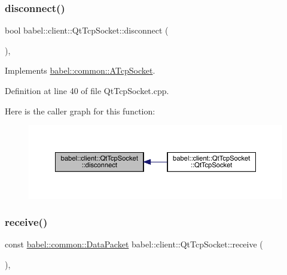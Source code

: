 \subsubsection{\texorpdfstring{disconnect()}{disconnect()}}
{\footnotesize\ttfamily bool babel\+::client\+::\+Qt\+Tcp\+Socket\+::disconnect (\begin{DoxyParamCaption}{ }\end{DoxyParamCaption})\hspace{0.3cm}{\ttfamily [override]}, {\ttfamily [virtual]}}



Implements \mbox{\hyperlink{classbabel_1_1common_1_1_a_tcp_socket_a8aa4d31dccc7314d5866410846d83159}{babel\+::common\+::\+A\+Tcp\+Socket}}.



Definition at line 40 of file Qt\+Tcp\+Socket.\+cpp.

Here is the caller graph for this function\+:\nopagebreak
\begin{figure}[H]
\begin{center}
\leavevmode
\includegraphics[width=350pt]{classbabel_1_1client_1_1_qt_tcp_socket_a16d6be985545aaa0376250896accc586_icgraph}
\end{center}
\end{figure}
\mbox{\label{classbabel_1_1client_1_1_qt_tcp_socket_ac79df4ffe6efc050afe567c596754e5c}} 
\subsubsection{\texorpdfstring{receive()}{receive()}}
{\footnotesize\ttfamily const \mbox{\hyperlink{classbabel_1_1common_1_1_data_packet}{babel\+::common\+::\+Data\+Packet}} babel\+::client\+::\+Qt\+Tcp\+Socket\+::receive (\begin{DoxyParamCaption}{ }\end{DoxyParamCaption})\hspace{0.3cm}{\ttfamily [override]}, {\ttfamily [virtual]}}



